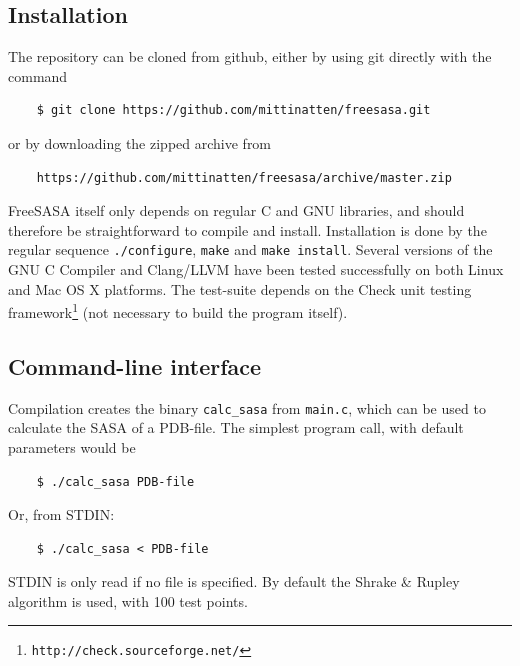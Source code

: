 \documentclass[a4paper,11pt]{article}
\begin{document}
\subsection{Installation} \label{sec:installing}

The repository can be cloned from github, either by using git directly
with the command
\begin{verbatim}
    $ git clone https://github.com/mittinatten/freesasa.git
\end{verbatim}
or by downloading the zipped archive from
\begin{verbatim}
    https://github.com/mittinatten/freesasa/archive/master.zip
\end{verbatim}
FreeSASA itself only depends on regular C and GNU libraries, and should
therefore be straightforward to compile and install. Installation is
done by the regular sequence \verb|./configure|, \verb|make| and
\verb|make install|. Several versions of the GNU C Compiler and
Clang/LLVM have been tested successfully on both Linux and Mac OS X
platforms. The test-suite depends on the Check unit testing
framework\footnote{\texttt{http://check.sourceforge.net/}} (not
necessary to build the program itself).

\subsection{Command-line interface}

Compilation creates the binary \verb|calc_sasa| from
\verb|main.c|, which can be used to calculate the SASA of a
PDB-file. The simplest program call, with default parameters would be
\begin{verbatim}
    $ ./calc_sasa PDB-file
\end{verbatim}
Or, from STDIN:
\begin{verbatim} 
    $ ./calc_sasa < PDB-file    
\end{verbatim}
STDIN is only read if no file is specified.  By default the Shrake \&
Rupley algorithm is used, with 100 test points. 
\end{document}
